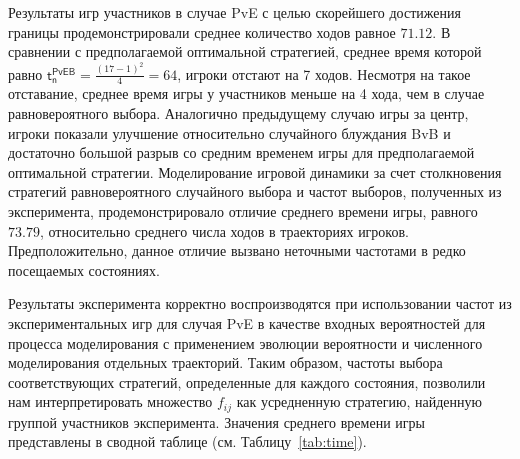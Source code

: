 Результаты игр участников в случае PvE с целью скорейшего достижения границы продемонстрировали среднее количество ходов равное $71.12$.
В сравнении с предполагаемой оптимальной стратегией, среднее время которой равно $\boldsymbol{\mathsf{t_n^{PvE B}}} = \frac{(17-1)^2}{4} = 64$, игроки 
отстают на 7 ходов. Несмотря на такое отставание, среднее время игры у участников меньше на 4 хода, чем в случае равновероятного выбора. 
Аналогично предыдущему случаю игры за центр, игроки показали улучшение относительно случайного блуждания BvB и достаточно большой разрыв со средним временем игры
для предполагаемой оптимальной стратегии. Моделирование игровой динамики за счет столкновения стратегий равновероятного случайного выбора и 
частот выборов, полученных из эксперимента, продемонстрировало отличие среднего времени игры, равного $73.79$, относительно среднего числа ходов в траекториях игроков.
Предположительно, данное отличие вызвано неточными частотами в редко посещаемых состояниях. 

Результаты эксперимента корректно воспроизводятся при использовании частот из экспериментальных игр для случая PvE в
качестве входных вероятностей для процесса моделирования с применением эволюции вероятности и численного моделирования отдельных траекторий. 
Таким образом, частоты выбора соответствующих стратегий, определенные для каждого состояния, позволили нам интерпретировать множество $f_{ij}$ как усредненную стратегию, 
найденную группой участников эксперимента. Значения среднего времени игры представлены в сводной таблице (см. Таблицу~\cref{tab:time}).

